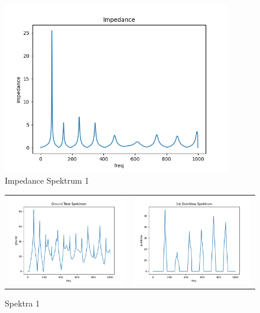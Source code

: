 \documentclass{article}
\begin{document}
    \begin{figure}[!h]
    {\includegraphics[width=100mm]
    {0_impedance.png}
    \caption{Impedance Spektrum 1}}
    \end{figure}
    \begin{figure}[!h]
        \begin{tabular}{cc}
                \includegraphics[width=75mm]{0_ground.png} &  
                \includegraphics[width=75mm]{0_overblow} \\
        \end{tabular}
    \caption{Spektra 1}
    \end{figure}
    
\end{document}
